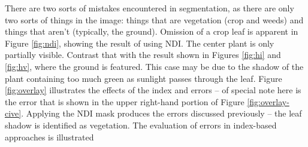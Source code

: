 \documentclass[letterpaper]{article}
\begin{document}
{{There are two sorts of mistakes encountered in segmentation, as there are only two sorts of things in the image: things that are vegetation (crop and weeds) and things that aren't (typically, the ground). Omission of a crop leaf is apparent in Figure \ref{fig:ndi}, showing the result of using NDI.  The center plant is only partially visible. Contrast that with the result shown in Figures \ref{fig:hi} and  \ref{fig:hv}, where the ground is featured. This case may be due to the shadow of the plant containing too much green as sunlight passes through the leaf. Figure \ref{fig:overlay} illustrates the effects of the index and errors -- of special note here is the error that is shown in the upper right-hand portion of Figure \ref{fig:overlay-cive}. Applying the NDI mask produces the errors discussed previously -- the leaf shadow is identified as vegetation. The evaluation of errors in index-based approaches is illustrated 

}}
\end{document}
